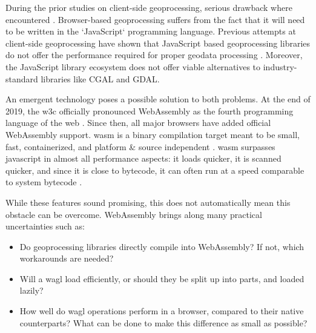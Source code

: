 During the prior studies on client-side geoprocessing, serious drawback where encountered \cite{panidi_hybrid_2015, hamilton_client-side_2014}. Browser-based geoprocessing suffers from the fact that it will need to be written in the `JavaScript` programming language. Previous attempts at client-side geoprocessing have shown that JavaScript based geoprocessing libraries do not offer the performance required for proper geodata processing \cite{hamilton_client-side_2014}. 
Moreover, the JavaScript library ecosystem does not offer viable alternatives to industry-standard libraries like CGAL and GDAL. 

An emergent technology poses a possible solution to both problems. At the end of 2019, the \ac{w3c} officially pronounced WebAssembly as the fourth programming language of the web \cite{w3c_world_2019}. Since then, all major browsers have added official WebAssembly support. \ac{wasm} is a binary compilation target meant to be small, fast, containerized, and platform \& source independent \cite{haas_bringing_2017}. \ac{wasm} surpasses javascript in almost all performance aspects: it loads quicker, it is scanned quicker, and since it is close to bytecode, it can often run at a speed comparable to system bytecode \cite{jangda_not_2019}. 

While these features sound promising, this does not automatically mean this obstacle can be overcome. WebAssembly brings along many practical uncertainties such as:

\begin{itemize}
  \item Do geoprocessing libraries directly compile into WebAssembly? If not, which workarounds are needed? 
  \item Will a \ac{wagl} load efficiently, or should they be split up into parts, and loaded lazily? 
  \item How well do \ac{wagl} operations perform in a browser, compared to their native counterparts? What can be done to make this difference as small as possible?
\end{itemize}

